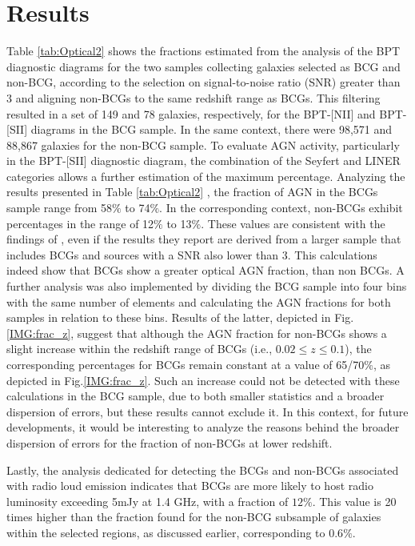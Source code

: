 \chapter{Results}
Table \ref{tab:Optical2} shows the fractions estimated from the analysis of the BPT diagnostic diagrams for the two samples collecting galaxies selected as BCG and non-BCG, according to the selection on signal-to-noise ratio (SNR) greater than 3 and aligning non-BCGs to the same redshift range as BCGs. This filtering resulted in a set of 149 and 78 galaxies, respectively, for the BPT-[NII] and BPT-[SII] diagrams in the BCG sample. In the same context, there were 98,571 and 88,867 galaxies for the non-BCG sample.
To evaluate AGN activity, particularly in the BPT-[SII] diagnostic diagram, the combination of the Seyfert and LINER categories allows a further estimation of the maximum percentage. Analyzing the results presented in Table \ref{tab:Optical2} , the fraction of AGN in the BCGs sample range from 58$\%$ to 74$\%$. In the corresponding context, non-BCGs exhibit percentages in the range of 12$\%$ to 13$\%$. These values are consistent with the findings of \cite{2012A&A...546A..17V}, even if the results they report are derived from a larger sample that includes BCGs and sources with a SNR also lower than 3.
This calculations indeed show that BCGs show a greater optical AGN fraction, than non BCGs.
A further analysis was also implemented by dividing the BCG sample into four bins with the same number of elements and calculating the AGN fractions for both samples in relation to these bins.
Results of the latter, depicted in Fig.\ref{IMG:frac_z}, suggest that although the AGN fraction for non-BCGs shows a slight increase within the redshift range of BCGs (i.e., $0.02 \leq z \leq 0.1$), the corresponding percentages for BCGs remain constant at a value of 65/70$\%$, as depicted in Fig.\ref{IMG:frac_z}. Such an increase could not be detected with these calculations in the BCG sample, due to both smaller statistics and a broader dispersion of errors, but these results cannot exclude it. In this context, for future developments, it would be interesting to analyze the reasons behind the broader dispersion of errors for the fraction of non-BCGs at lower redshift.

Lastly, the analysis dedicated for detecting the BCGs and non-BCGs associated with radio loud emission indicates that BCGs are more likely to host radio luminosity exceeding 5mJy at 1.4 GHz, with a fraction of $12\%$. This value is 20 times higher than the fraction found for the non-BCG subsample of galaxies within the selected regions, as discussed earlier, corresponding to $0.6\%$.

